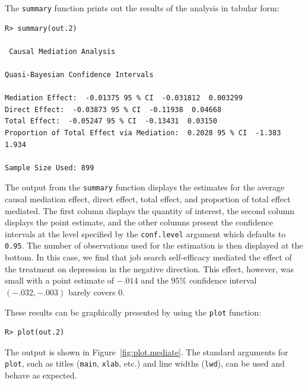 \documentclass[11pt,letterpaper]{article}
\theoremstyle{plain}
\begin{document}
The \texttt{summary}
function prints out the results of the analysis in tabular form:
\begin{verbatim}
R> summary(out.2)

 Causal Mediation Analysis 

Quasi-Bayesian Confidence Intervals

Mediation Effect:  -0.01375 95 % CI  -0.031812  0.003299 
Direct Effect:  -0.03873 95 % CI  -0.11938  0.04668 
Total Effect:  -0.05247 95 % CI  -0.13431  0.03150 
Proportion of Total Effect via Mediation:  0.2028 95 % CI  -1.383  1.934 

Sample Size Used: 899 
\end{verbatim}
The output from the {\tt summary} function displays the estimates
for the average causal mediation effect, direct effect, total effect,
and proportion of total effect mediated. The first column displays the
quantity of interest, the second column displays the point estimate,
and the other columns present the confidence intervals at the level
specified by the {\tt conf.level} argument which defaults to {\tt 0.95}.
The number of observations used for the estimation is then displayed at
the bottom.  In this case, we
find that job search self-efficacy mediated the effect of the
treatment on depression in the negative direction. This effect,
however, was small with a point estimate of $-.014$ and the $95\%$
confidence interval $(-.032,-.003)$ barely covers $0$.

These results can be graphically presented by using the {\tt plot} function:
\begin{verbatim}
R> plot(out.2)
\end{verbatim}
The output is shown in Figure~\ref{fig:plot.mediate}. The standard arguments
for {\tt plot}, such as titles ({\tt main}, {\tt xlab}, etc.) and line widths 
({\tt lwd}), can be used and behave as expected.
\end{document}
